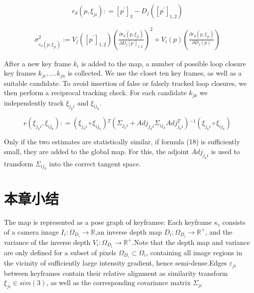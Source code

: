 \begin{equation}
r_{d}(p,\xi _{ji}): = [p^{'}]_{3} - D_{j}([p^{'}]_{1,2})
\end{equation}

\begin{equation}
\begin{split}
\sigma_{r_{d}(p,\xi_{ji})} ^{2} :=V_{j}( [ p^{'} ]_{1,2} )  {\left( \frac {\partial r_{d}(p,\xi_{ji})} {\partial D_{j} \left[ p^{'} \right]_{1,2}}  \right)^{2}} + V_{i}(p) \left( \frac {\partial r_{d}(p,\xi_{ji})} {\partial D_{j}(p)} \right)
\end{split}
\end{equation}

After a new key frame ${k_i}$ is added to the map, a number of possible loop closure key frames ${k_{ji}},....{k_{jn}}$ is collected. We use the closet ten key frames, as well as a suitable candidate. To avoid insertion of false or falsely tracked loop closures, we then perform a reciprocal tracking check. For each candidate ${k_{jk}}$ we independently track ${\xi _{{j_k}i}}$ and ${\xi _{i{j_k}}}$.

\begin{equation}
e\!(\!{\xi _{{j_k}i}},{\xi _{i{j_k}}})\!: \!= \!{\!(\!{\xi _{{j_k}i}} \!\circ \!{\xi _{i{j_k}}})\!^T}{\!(\!{\Sigma _{{j_k}i}}\! +\! Ad{j_{{j_k}i}}{\Sigma _{i{j_k}}}Adj_{{j_k}i}^T\!)\!^{ - 1}}\!(\!{\xi _{{j_k}i}}\! \circ\! {\xi _{i{j_k}}}\!)
\end{equation}

Only if the two estimates are statistically similar, if formula (18) is sufficiently small, they are added to the global map. For this, the adjoint $Ad{j_{{j_k}i}}$ is used to transform ${\Sigma _{i{j_k}}}$ into the correct tangent space.




\section{本章小结}




The map is represented as a pose graph of keyframes: Each keyframe $\kappa_{i}$ consists of a camera image $I_{i}\!:\!\Omega_{D_{i}}\!\rightarrow \!{\mathbb{R}}$,an inverse depth map $D_{i}\!:\!\Omega_{D_{i}}\!\rightarrow \!{\mathbb{R}}^{+}$, and the variance of the inverse depth $ V_{i}\!:\!\Omega_{D_{i}}\!\rightarrow \!{\mathbb{R}}^{+}$.Note that the depth map and variance are only defined for a subset of pixels $ \Omega_{D_{i}}\!\subset\!\Omega_{i} $, containing all image regions in the vicinity of sufficiently large intensity gradient, hence semi-dense.Edges $ \varepsilon_{ji}$ between keyframes contain their relative alignment as similarity transform $ \xi_{ji}\in sim(3) $, as well as the corresponding covariance matrix $\Sigma_{ji} $

